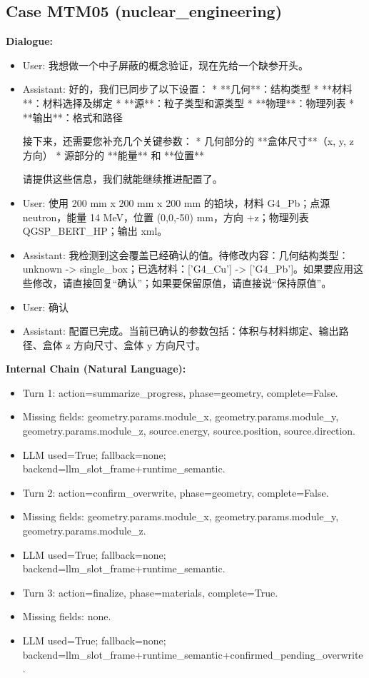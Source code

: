\documentclass[11pt]{ctexart}
\begin{document}
\subsection{Case MTM05 (nuclear\_engineering)}
\textbf{Dialogue:}
\begin{itemize}
\item User: 我想做一个中子屏蔽的概念验证，现在先给一个缺参开头。
\item Assistant: 好的，我们已同步了以下设置：
*   **几何**：结构类型
*   **材料**：材料选择及绑定
*   **源**：粒子类型和源类型
*   **物理**：物理列表
*   **输出**：格式和路径

接下来，还需要您补充几个关键参数：
*   几何部分的 **盒体尺寸**（x, y, z 方向）
*   源部分的 **能量** 和 **位置**

请提供这些信息，我们就能继续推进配置了。
\item User: 使用 200 mm x 200 mm x 200 mm 的铅块，材料 G4\_Pb；点源 neutron，能量 14 MeV，位置 (0,0,-50) mm，方向 +z；物理列表 QGSP\_BERT\_HP；输出 xml。
\item Assistant: 我检测到这会覆盖已经确认的值。待修改内容：几何结构类型：unknown -> single\_box；已选材料：['G4\_Cu'] -> ['G4\_Pb']。如果要应用这些修改，请直接回复“确认”；如果要保留原值，请直接说“保持原值”。
\item User: 确认
\item Assistant: 配置已完成。当前已确认的参数包括：体积与材料绑定、输出路径、盒体 z 方向尺寸、盒体 y 方向尺寸。
\end{itemize}
\textbf{Internal Chain (Natural Language):}
\begin{itemize}
\item Turn 1: action=summarize\_progress, phase=geometry, complete=False.
\item Missing fields: geometry.params.module\_x, geometry.params.module\_y, geometry.params.module\_z, source.energy, source.position, source.direction.
\item LLM used=True; fallback=none; backend=llm\_slot\_frame+runtime\_semantic.
\item Turn 2: action=confirm\_overwrite, phase=geometry, complete=False.
\item Missing fields: geometry.params.module\_x, geometry.params.module\_y, geometry.params.module\_z.
\item LLM used=True; fallback=none; backend=llm\_slot\_frame+runtime\_semantic.
\item Turn 3: action=finalize, phase=materials, complete=True.
\item Missing fields: none.
\item LLM used=True; fallback=none; backend=llm\_slot\_frame+runtime\_semantic+confirmed\_pending\_overwrite.
\end{itemize}
\end{document}
